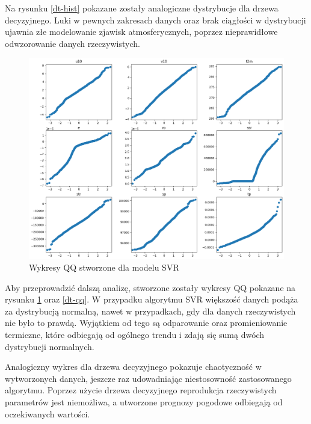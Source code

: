 Na rysunku \ref{dt-hist} pokazane zostały analogiczne dystrybucje dla drzewa decyzyjnego. Luki w 
pewnych zakresach danych oraz brak ciągłości w dystrybucji ujawnia złe modelowanie zjawisk atmosferycznych,
poprzez nieprawidłowe odwzorowanie danych rzeczywistych. 

\begin{figure}[H]
    \centering
    \includegraphics[width=\textwidth]{images/svr_qq.png}
    \caption{Wykresy QQ stworzone dla modelu SVR}
    \label{svr-qq}
\end{figure}

Aby przeprowadzić dalszą analizę, stworzone zostały wykresy QQ pokazane na rysunku \ref{svr-qq} oraz \ref{dt-qq}.
W przypadku algorytmu SVR większość danych podąża za dystrybucją normalną, nawet w przypadkach,
gdy dla danych rzeczywistych nie było to prawdą. Wyjątkiem od tego są odparowanie oraz promieniowanie 
termiczne, które odbiegają od ogólnego trendu i zdają się sumą dwóch dystrybucji normalnych.

Analogiczny wykres dla drzewa decyzyjnego pokazuje chaotyczność w wytworzonych danych, jeszcze raz 
udowadniając niestosowność zastosowanego algorytmu. Poprzez użycie drzewa decyzyjnego reprodukcja
rzeczywistych parametrów jest niemożliwa, a utworzone prognozy pogodowe odbiegają od oczekiwanych wartości.

